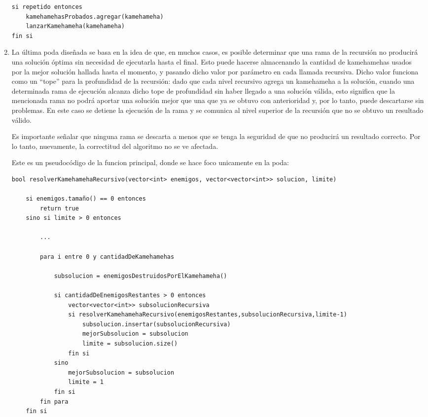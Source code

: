 \begin{enumerate}
\begin{codesnippet}
\begin{verbatim}
si repetido entonces
    kamehamehasProbados.agregar(kamehameha)
    lanzarKamehameha(kamehameha)
fin si
        \end{verbatim}
        \end{codesnippet}

        \item La última poda diseñada se basa en la idea de que, en muchos casos, es posible determinar que una rama de la recursión no producirá una solución óptima sin necesidad de ejecutarla hasta el final. Esto puede hacerse almacenando la cantidad de kamehamehas usados por la mejor solución hallada hasta el momento, y pasando dicho valor por parámetro en cada llamada recursiva. Dicho valor funciona como un ``tope'' para la profundidad de la recursión: dado que cada nivel recursivo agrega un kamehameha a la solución, cuando una determinada rama de ejecución alcanza dicho tope de profundidad sin haber llegado a una solución válida, esto significa que la mencionada rama no podrá aportar una solución mejor que una que ya se obtuvo con anterioridad y, por lo tanto, puede descartarse sin problemas. En este caso se detiene la ejecución de la rama y se comunica al nivel superior de la recursión que no se obtuvo un resultado válido.

        Es importante señalar que ninguna rama se descarta a menos que se tenga la seguridad de que no producirá un resultado correcto. Por lo tanto, nuevamente, la correctitud del algoritmo no se ve afectada.

        Este es un pseudocódigo de la funcion principal, donde se hace foco unicamente en la poda:

        \begin{codesnippet}
        \begin{verbatim}
bool resolverKamehamehaRecursivo(vector<int> enemigos, vector<vector<int>> solucion, limite)
  
    si enemigos.tamaño() == 0 entonces
        return true
    sino si limite > 0 entonces
      
        ...
        
        para i entre 0 y cantidadDeKamehamehas
          
            subsolucion = enemigosDestruidosPorElKamehameha()
          
            si cantidadDeEnemigosRestantes > 0 entonces
                vector<vector<int>> subsolucionRecursiva
                si resolverKamehamehaRecursivo(enemigosRestantes,subsolucionRecursiva,limite-1)
                    subsolucion.insertar(subsolucionRecursiva)
                    mejorSubsolucion = subsolucion
                    limite = subsolucion.size()
                fin si
            sino
                mejorSubsolucion = subsolucion
                limite = 1
            fin si
        fin para
    fin si
  

\end{verbatim}
\end{codesnippet}
\end{enumerate}
